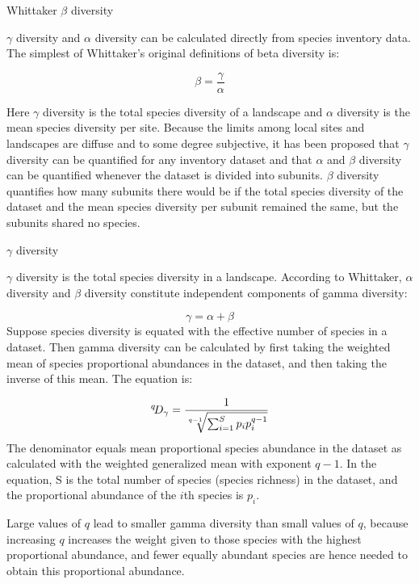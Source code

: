 \documentclass[
  ignorenonframetext,
  aspectratio=169]{beamer}
\begin{document}
\begin{frame}{Whittaker \(\beta\) diversity}
\protect\hypertarget{whittaker-beta-diversity}{}
\footnotesize

\(\gamma\) diversity and \(\alpha\) diversity can be calculated directly
from species inventory data. The simplest of Whittaker's original
definitions of beta diversity is:

\[
\beta = \frac{\gamma}{\alpha}
\]

Here \(\gamma\) diversity is the total species diversity of a landscape
and \(\alpha\) diversity is the mean species diversity per site. Because
the limits among local sites and landscapes are diffuse and to some
degree subjective, it has been proposed that \(\gamma\) diversity can be
quantified for any inventory dataset and that \(\alpha\) and \(\beta\)
diversity can be quantified whenever the dataset is divided into
subunits. \(\beta\) diversity quantifies how many subunits there would
be if the total species diversity of the dataset and the mean species
diversity per subunit remained the same, but the subunits shared no
species.
\end{frame}

\begin{frame}{\(\gamma\) diversity}
\protect\hypertarget{gamma-diversity}{}
\footnotesize

\(\gamma\) diversity is the total species diversity in a landscape.
According to Whittaker, \(\alpha\) diversity and \(\beta\) diversity
constitute independent components of gamma diversity:

\[
\gamma = \alpha + \beta
\] Suppose species diversity is equated with the effective number of
species in a dataset. Then gamma diversity can be calculated by first
taking the weighted mean of species proportional abundances in the
dataset, and then taking the inverse of this mean. The equation is:

\[
{}^{q}\!D_{\gamma }={1 \over {\sqrt[{q-1}]{\sum _{i=1}^{S}p_{i}p_{i}^{q-1}}}}
\] The denominator equals mean proportional species abundance in the
dataset as calculated with the weighted generalized mean with exponent
\(q - 1\). In the equation, S is the total number of species (species
richness) in the dataset, and the proportional abundance of the \(i\)th
species is \(p_{i}\).

Large values of \(q\) lead to smaller gamma diversity than small values
of \(q\), because increasing \(q\) increases the weight given to those
species with the highest proportional abundance, and fewer equally
abundant species are hence needed to obtain this proportional abundance.
\end{frame}
\end{document}
